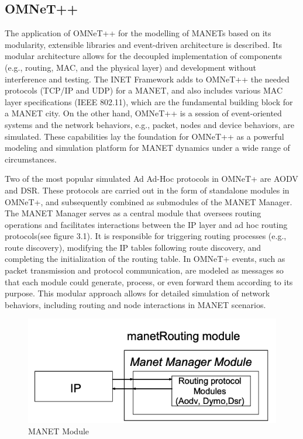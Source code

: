 \documentclass[]{nsm-thesis}
\begin{document}
\subsection{OMNeT++}
The application of OMNeT++ for the modelling of MANETs based on its modularity, extensible libraries and event-driven architecture is described. Its modular architecture allows for the decoupled implementation of components (e.g., routing, MAC, and the physical layer) and development without interference and testing. The INET Framework adds to OMNeT++ the needed protocols (TCP/IP and UDP)\cite{idserda2004tcp} for a MANET, and also includes various MAC layer specifications (IEEE 802.11), which are the fundamental building block for a MANET city. On the other hand, OMNeT++ is a session of event-oriented systems and the network behaviors, e.g., packet, nodes and device behaviors, are simulated. These capabilities lay the foundation for OMNeT++ as a powerful modeling and simulation platform for MANET dynamics under a wide range of circumstances.

Two of the most popular simulated Ad Ad-Hoc protocols in OMNeT+ are AODV \cite{parmar2014performance} and DSR\cite{bhatia2016comparative}. These protocols are carried out in the form of standalone modules in OMNeT+, and subsequently combined as submodules of the MANET Manager. The MANET Manager serves as a central module that oversees routing operations and facilitates interactions between the IP layer and ad hoc routing protocols(see figure 3.1). It is responsible for triggering routing processes (e.g., route discovery), modifying the IP tables following route discovery, and completing the initialization of the routing table. In OMNeT+ events, such as packet transmission and protocol communication, are modeled as messages so that each module could generate, process, or even forward them according to its purpose. This modular approach allows for detailed simulation of network behaviors, including routing and node interactions in MANET scenarios.
\begin{figure}[h]
\graphicspath{{/image/}} %
\centering
\includegraphics[scale=0.6]{image/Manet routing.png} %
\caption{MANET Module\cite{ariza2008implementation}}
\label{fig:mesh3} %
\end{figure}
\end{document}
